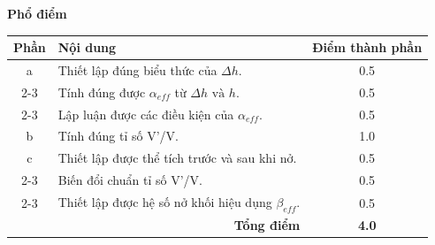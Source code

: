 \vspace{0.5cm}

\noindent \textbf{\large Phổ điểm}
\begin{center}
\renewcommand{\arraystretch}{1.5}
\begin{tabularx}{\linewidth}{|c|X|c|}
\hline
\textbf{Phần} & \textbf{Nội dung} & \textbf{Điểm thành phần} \\ \hline
a & Thiết lập đúng biểu thức của $\Delta h$. & 0.5 \\ \cline{2-3} 
 & Tính đúng được $\alpha_{eff}$ từ $\Delta h \text{ và } h $. & 0.5 \\ \cline{2-3} 
 & Lập luận được các điều kiện của $\alpha_{eff}$. & 0.5 \\ \hline
b & Tính đúng tỉ số V'/V. & 1.0 \\ \hline
c & Thiết lập được thể tích trước và sau khi nở. & 0.5 \\ \cline{2-3} 
 & Biến đổi chuẩn tỉ số V'/V. & 0.5 \\ \cline{2-3} 
 & Thiết lập được hệ số nở khối hiệu dụng $\beta_{eff}$. & 0.5 \\ \hline
\multicolumn{2}{|r|}{\textbf{Tổng điểm}} & \textbf{4.0} \\ \hline
\end{tabularx}
\end{center}
